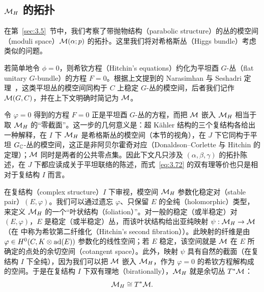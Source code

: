 

\subsection{\texorpdfstring{${\mathcal{M}}_H$ 的拓扑}{M_H 的拓扑}}

\label{sec:3.6}

在第~\ref{sec:3.5}~节中，我们考察了带抛物结构（parabolic structure）的丛的模空间（moduli space）${\mathcal{M}}(\alpha;p)$ 的拓扑。这里我们将对希格斯丛（Higgs bundle）考虑类似的问题。

若简单地令 $\phi=0$，则希钦方程（Hitchin's equations）约化为平坦酉 $G$-丛（flat unitary $G$-bundle）的方程 $F=0$。根据上文提到的 Narasimhan 与 Seshadri 定理~\cite{ref51}，这类平坦丛的模空间同构于 $C$ 上稳定 $G$-丛的模空间，后者我们记作 ${\mathcal{M}}(G,C)$，并在上下文明确时简记为 ${\mathcal{M}}$。

\begin{yizhu}[物理图像补充]
令 $\varphi=0$ 得到的方程 $F=0$ 正是平坦酉 $G$-丛的方程，而把 ${\mathcal{M}}$ 嵌入 ${{\mathcal{M}}_H}$ 相当于取 ${{\mathcal{M}}_H}$ 的“零截面”。这一步的几何意义是：超 Kähler 结构的三个复结构各给出一种解释，在 $I$ 下 ${{\mathcal{M}}_H}$ 是希格斯丛的模空间（本节的视角），在 $J$ 下它同构于平坦 $G_{\mathbb{C}}$-丛的模空间，这正是非阿贝尔霍奇对应（Donaldson--Corlette 与 Hitchin 的定理）；${\mathcal{M}}$ 同时是两者的公共零点集。因此下文凡只涉及 $(\alpha,\beta,\gamma)$ 的拓扑陈述，在 $J$ 下都应读成关于平坦联络的陈述，而式~\eqref{eq:3.72} 的双有理等价也只是相对于复结构 $I$ 而言。
\end{yizhu}

在复结构（complex structure）$I$ 下审视，模空间 ${{\mathcal{M}}_H}$ 参数化稳定对（stable pair）$(E,\varphi)$。我们可以通过遗忘 $\varphi$、只保留 $E$ 的全纯（holomorphic）类型，来定义 ${{\mathcal{M}}_H}$ 的一个“叶状结构（foliation）”。对一般的稳定（或半稳定）对 $(E,\varphi)$，$E$ 是稳定（或半稳定）丛，而该叶状结构给出亚纯映射 $\psi:{\mathcal{M}}_H\to {\mathcal{M}}$（在 \cite{ref8} 中称为希钦第二纤维化（Hitchin's second fibration））。此映射的纤维是由 $\varphi\in H^0(C,K\otimes{\rm ad}(E))$ 参数化的线性空间；若 $E$ 稳定，该空间就是 ${\mathcal{M}}$ 在 $E$ 所确定的点处的余切空间（cotangent space）。此外，映射 $\psi$ 具有自然的截面（在复结构 $I$ 下全纯），因为我们可以把 ${\mathcal{M}}$ 嵌入 ${\mathcal{M}}_H$，作为 $\varphi=0$ 的希钦方程解构成的空间。于是在复结构 $I$ 下双有理地（birationally），${{\mathcal{M}}_H}$ 就是余切丛 $T^*{\mathcal{M}}$：
\setcounter{equation}{71}
\begin{equation}\label{eq:3.72}
  {{\mathcal{M}}_H}\cong T^*{\mathcal{M}}.
\end{equation}

